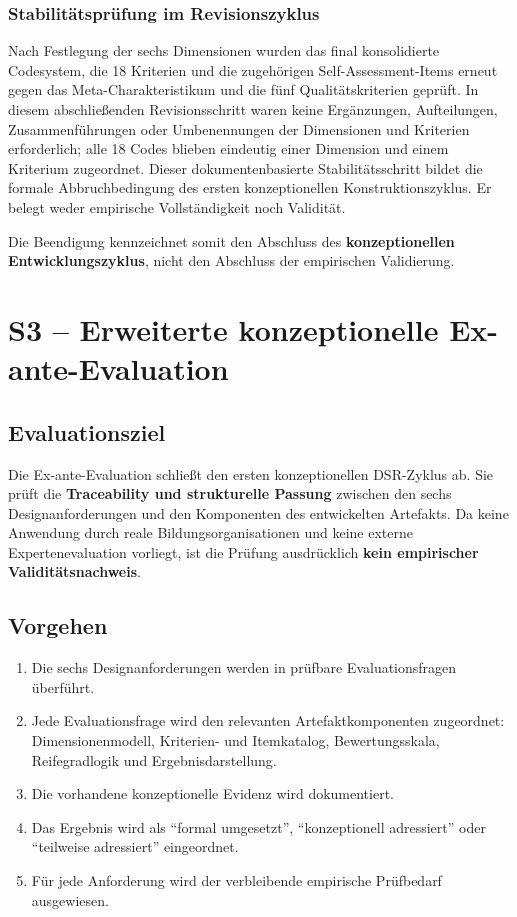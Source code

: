 \documentclass[10pt,a4paper]{article}
\begin{document}
\subsubsection{Stabilitätsprüfung im Revisionszyklus}

Nach Festlegung der sechs Dimensionen wurden das final konsolidierte Codesystem, die 18 Kriterien und die zugehörigen Self-Assessment-Items erneut gegen das Meta-Charakteristikum und die fünf Qualitätskriterien geprüft. In diesem abschließenden Revisionsschritt waren keine Ergänzungen, Aufteilungen, Zusammenführungen oder Umbenennungen der Dimensionen und Kriterien erforderlich; alle 18 Codes blieben eindeutig einer Dimension und einem Kriterium zugeordnet. Dieser dokumentenbasierte Stabilitätsschritt bildet die formale Abbruchbedingung des ersten konzeptionellen Konstruktionszyklus. Er belegt weder empirische Vollständigkeit noch Validität.

Die Beendigung kennzeichnet somit den Abschluss des \textbf{konzeptionellen Entwicklungszyklus}, nicht den Abschluss der empirischen Validierung.

\section{S3 – Erweiterte konzeptionelle Ex-ante-Evaluation}
\label{supp:s3}

\subsection{Evaluationsziel}

Die Ex-ante-Evaluation schließt den ersten konzeptionellen DSR-Zyklus ab. Sie prüft die \textbf{Traceability und strukturelle Passung} zwischen den sechs Designanforderungen und den Komponenten des entwickelten Artefakts. Da keine Anwendung durch reale Bildungsorganisationen und keine externe Expertenevaluation vorliegt, ist die Prüfung ausdrücklich \textbf{kein empirischer Validitätsnachweis}.

\subsection{Vorgehen}

\begin{enumerate}
  \item Die sechs Designanforderungen werden in prüfbare Evaluationsfragen überführt.
  \item Jede Evaluationsfrage wird den relevanten Artefaktkomponenten zugeordnet: Dimensionenmodell, Kriterien- und Itemkatalog, Bewertungsskala, Reifegradlogik und Ergebnisdarstellung.
  \item Die vorhandene konzeptionelle Evidenz wird dokumentiert.
  \item Das Ergebnis wird als \enquote{formal umgesetzt}, \enquote{konzeptionell adressiert} oder \enquote{teilweise adressiert} eingeordnet.
  \item Für jede Anforderung wird der verbleibende empirische Prüfbedarf ausgewiesen.
\end{enumerate}
\end{document}
